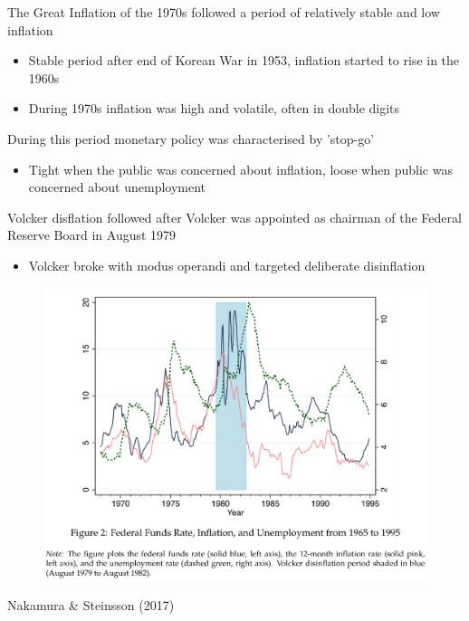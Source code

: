 \documentclass{beamer}
\begin{document}
\begin{frame}
  The Great Inflation of the 1970s followed a period of relatively stable and low inflation 
 \begin{itemize}
   \item Stable period after end of Korean War in 1953, inflation started to rise in the 1960s
   \item During 1970s inflation was high and volatile, often in double digits
 \end{itemize}
 \medskip
 During this period monetary policy was characterised by 'stop-go' 
 \begin{itemize}
   \item Tight when the public was concerned about inflation, loose when public was concerned about unemployment
 \end{itemize}
 \medskip
 Volcker  disflation followed after Volcker was appointed as chairman of the Federal Reserve Board in August 1979
 \begin{itemize}
   \item Volcker broke with modus operandi and targeted deliberate disinflation  
 \end{itemize}  
\end{frame}

\begin{frame}
  \begin{figure}
    \includegraphics[scale=.6]{nakamura_steinsson.eps}
  \end{figure}
  Nakamura \& Steinsson (2017)
\end{frame}
\end{document}

